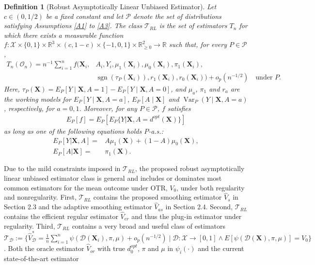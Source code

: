 \documentclass[11pt]{article}
\theoremstyle{referenceplain}
\theoremstyle{referencedefinition}
\newtheorem{definition}{Definition}
\theoremstyle{referenceremark}
\begin{document}
\begin{definition}[Robust Asymptotically Linear Unbiased Estimator]\label{ralu}
    Let $c\in(0,1/2)$ be a fixed constant and let $\mathcal{P}$ denote the set of distributions satisfying Assumptions \ref{A1} to \ref{A3}. The class $\mathcal{T}_{RL}$ is the set of estimators $T_n$ for which there exists a measurable function
    $f:\mathcal{X}\times\{0,1\}\times\mathbb{R}^{3}\times(c,1-c)\times\{-1,0,1\}\times\mathbb{R}_{\geq 0}^{2}\to\mathbb{R}$ such that, for every $P\in\mathcal{P}$,
    \begin{equation}
    \begin{split}
    T_n(\mathcal{O}_n)=n^{-1}\sum_{i=1}^n
    f\bigl(\mathbf{X}_i,&A_i,Y_i,\mu_1(\mathbf{X}_i),\mu_0(\mathbf{X}_i),\pi_1(\mathbf{X}_i),\\[-2pt]
    &\operatorname{sgn}(\tau_P(\mathbf{X}_i)),r_1(\mathbf{X}_i),r_0(\mathbf{X}_i)\bigr)+o_p(n^{-1/2})
    \quad\text{under }P.
    \end{split}
    \end{equation}
    Here, $\tau_P(\mathbf{X})=E_P[Y\mid\mathbf{X},A=1]-E_P[Y\mid\mathbf{X},A=0]$, and $\mu_a$, $\pi_1$ and $r_a$ are the working models for  $E_P[Y\mid\mathbf{X},A=a]$, $E_P[A\mid\mathbf{X}]$ and $\operatorname{Var}_P(Y\mid\mathbf{X},A=a)$, respectively, for $a=0,1$. Moreover, for any $P\in\mathcal{P}$, $f$ satisfies
    \begin{align}\label{unbias}
        E_P[f] = E_P[E_P\{Y|\mathbf{X},A=d^{opt}(\mathbf{X})\}]
    \end{align}
    as long as one of the following equations holds $P$-a.s.:
    \begin{align}
       E_P[Y|\mathbf{X},A] =& A \mu_1(\mathbf{X})+(1-A)\mu_0(\mathbf{X}),\label{robust-1}\\ E_P[A|\mathbf{X}]=&\pi_1(\mathbf{X}).\label{robust-2}     
    \end{align}
\end{definition}
Due to the mild constraints imposed in $\mathcal{T}_{RL}$, the proposed robust asymptotically linear unbiased estimator class is general and includes or dominates most common estimators for the mean outcome under OTR, $V_0$, under both regularity and nonregularity. First, $\mathcal{T}_{RL}$ contains the proposed smoothing estimator $\widehat{V}_s$ in Section 2.3 and the adaptive smoothing estimator $\widehat{V}_{as}$ in Section 2.4. Second, $\mathcal{T}_{RL}$ contains the efficient regular estimator $\widehat{V}_{er}$ and thus the plug-in estimator under regularity. Third, $\mathcal{T}_{RL}$ contains a very broad and useful class of estimators $\mathcal{T}_{\mathcal{D}}:=\{\widehat{V}_{\mathcal{D}}^* = \frac{1}{n}\sum_{i=1}^n \psi(\mathcal{D}(\mathbf{X}_i),\pi,\mu)+o_p(n^{-1/2})\mid \mathcal{D}:\mathcal{X}\to[0,1]\land E[\psi(\mathcal{D}(\mathbf{X}),\pi,\mu)]=V_0\}$. Both the oracle estimator $\widehat{V}_{or}$ with true $d_{0}^{opt}$, $\pi$ and $\mu$ in $\psi_i(\cdot)$ and the current state-of-the-art estimator 
\end{document}
